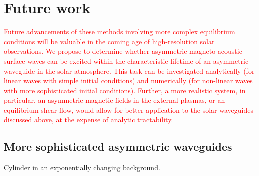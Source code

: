 \documentclass[12pt]{../style-files/ociamthesis}
\begin{document}
\baselineskip=18pt

\setcounter{secnumdepth}{3}
\setcounter{tocdepth}{3}

\setcounter{chapter}{6}


\chapter{Future work}
\label{chap: future work}

\textcolor{red}{Future advancements of these methods involving more complex equilibrium conditions will be valuable in the coming age of high-resolution solar observations. We propose to determine whether asymmetric magneto-acoustic surface waves can be excited within the characteristic lifetime of an asymmetric waveguide in the solar atmosphere. This task can be investigated analytically (for linear waves with simple initial conditions) and numerically (for non-linear waves with more sophisticated initial conditions). Further, a more realistic system, in particular, an asymmetric magnetic fields in the external plasmas, or an equilibrium shear flow, would allow for better application to the solar waveguides discussed above, at the expense of analytic tractability.}

\section{More sophisticated asymmetric waveguides}
\label{sec:}

Cylinder in an exponentially changing background.



  
\end{document}
